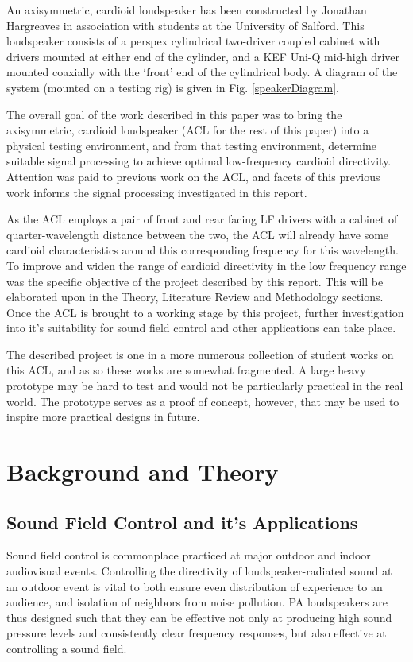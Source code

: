 \documentclass{report}
\begin{document}
    An axisymmetric, cardioid loudspeaker has been constructed by Jonathan Hargreaves in association with students at the University of Salford.
    This loudspeaker consists of a perspex cylindrical two-driver coupled cabinet with drivers mounted at either end of the cylinder, and a KEF Uni-Q mid-high driver mounted coaxially with the `front' end of the cylindrical body.
    A diagram of the system (mounted on a testing rig) is given in Fig. \ref{speakerDiagram}.
   
    The overall goal of the work described in this paper was to bring the axisymmetric, cardioid loudspeaker (ACL for the rest of this paper) into a physical testing environment, and from that testing environment, determine suitable signal processing to achieve optimal low-frequency cardioid directivity.
    Attention was paid to previous work on the ACL, and facets of this previous work informs the signal processing investigated in this report.

    As the ACL employs a pair of front and rear facing LF drivers with a cabinet of quarter-wavelength distance between the two, the ACL will already have some cardioid characteristics around this corresponding frequency for this wavelength.
    To improve and widen the range of cardioid directivity in the low frequency range was the specific objective of the project described by this report. 
    This will be elaborated upon in the Theory, Literature Review and Methodology sections.
    Once the ACL is brought to a working stage by this project, further investigation into it's suitability for sound field control and other applications can take place.

    The described project is one in a more numerous collection of student works on this ACL, and as so these works are somewhat fragmented.
    A large heavy prototype may be hard to test and would not be particularly practical in the real world.
    The prototype serves as a proof of concept, however, that may be used to inspire more practical designs in future. 


\chapter{Background and Theory}
    \section{Sound Field Control and it's Applications}
        Sound field control is commonplace practiced at major outdoor and indoor audiovisual events.
        Controlling the directivity of loudspeaker-radiated sound at an outdoor event is vital to both ensure even distribution of experience to an audience, and isolation of neighbors from noise pollution.
        PA loudspeakers are thus designed such that they can be effective not only at producing high sound pressure levels and consistently clear frequency responses, but also effective at controlling a sound field. 
\end{document}
